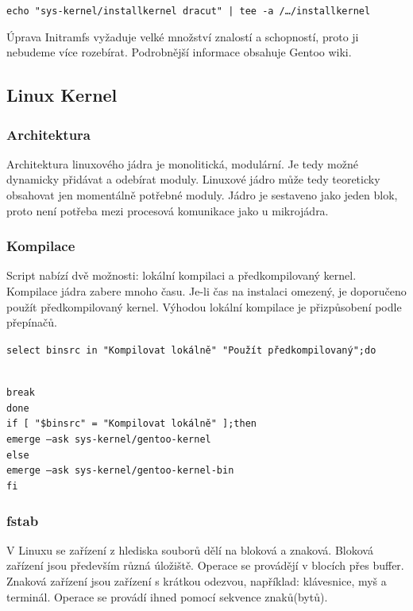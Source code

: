 \documentclass[12pt,a4paper,twoside,]{article}
\begin{document}
{{{{{{{\texttt{echo "sys-kernel/installkernel dracut" | tee -a /\dots/installkernel}

\hspace{-1.5em}Úprava {Initramfs} %
vyžaduje velké množství znalostí a schopností, proto ji nebudeme více rozebírat. Podrobnější informace obsahuje Gentoo wiki. 


\subsection{\textsf{Linux Kernel}}
\subsubsection{\textsf{Architektura}}
Architektura linuxového jádra je monolitická, modulární. Je tedy možné dynamicky přidávat a odebírat moduly. Linuxové jádro může tedy teoreticky obsahovat jen momentálně potřebné moduly. Jádro je sestaveno jako jeden blok, proto není potřeba mezi procesová komunikace jako u mikrojádra. 
\subsubsection{\textsf{Kompilace}}
Script nabízí dvě možnosti: lokální kompilaci a předkompilovaný kernel. Kompilace jádra zabere mnoho času. Je-li čas na instalaci omezený, je doporučeno použít předkompilovaný kernel. Výhodou lokální kompilace je přizpůsobení podle přepínačů. 

\hspace{-1.5em}\texttt{select binsrc in "Kompilovat lokálně" "Použít předkompilovaný";do}}\\
\hspace*{1.5em}\texttt{break}\\
\texttt{done}\\
\texttt{if [ "\$binsrc" = "Kompilovat lokálně" ];then}\\
\texttt{\hspace*{1.5em}emerge --ask sys-kernel/gentoo-kernel}\\
\texttt{else}\\
\texttt{\hspace*{1.5em}emerge --ask sys-kernel/gentoo-kernel-bin}\\
\texttt{fi}\\
\newpage
\subsubsection{\textsf{fstab}}
V Linuxu se zařízení z hlediska souborů dělí na bloková a znaková. Bloková zařízení jsou především různá úložiště. Operace se provádějí v blocích přes buffer. Znaková zařízení jsou zařízení s krátkou odezvou, například: klávesnice, myš a terminál. Operace se provádí ihned pomocí sekvence znaků(bytů).

}}}}}}
\end{document}
